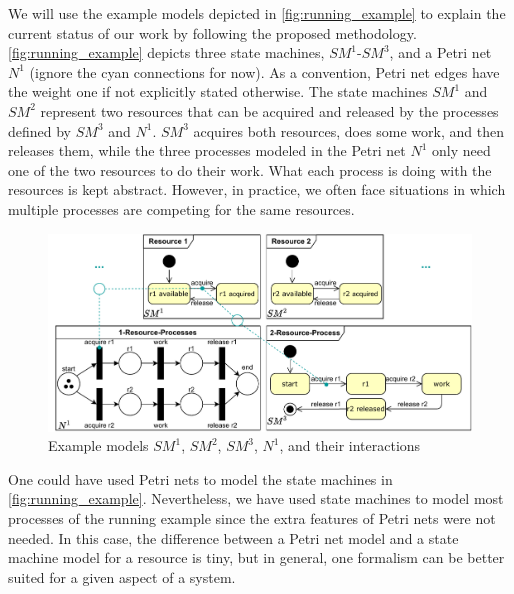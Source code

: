 \documentclass[conference]{IEEEtran}
\begin{document}
We will use the example models depicted in \autoref{fig:running_example} to explain the current status of our work by following the proposed methodology.
\autoref{fig:running_example} depicts three state machines, $SM^1$-$SM^3$, and a Petri net $N^1$ (ignore the cyan connections for now).
As a convention, Petri net edges have the weight one if not explicitly stated otherwise.
The state machines $SM^1$ and $SM^2$ represent two resources that can be acquired and released by the processes defined by $SM^3$ and $N^1$.
$SM^3$ acquires both resources, does some work, and then releases them, while the three processes modeled in the Petri net $N^1$ only need one of the two resources to do their work.
What each process is doing with the resources is kept abstract.
However, in practice, we often face situations in which multiple processes are competing for the same resources.

\begin{figure}[h]
    \centering
    \includegraphics[width=5in]{example}
    \caption{Example models $SM^1$, $SM^2$, $SM^3$, $N^1$, and their interactions}
    \label{fig:running_example}
\end{figure}

One could have used Petri nets to model the state machines in \autoref{fig:running_example}.
Nevertheless, we have used state machines to model most processes of the running example since the extra features of Petri nets were not needed.
In this case, the difference between a Petri net model and a state machine model for a resource is tiny, but in general, one formalism can be better suited for a given aspect of a system.
\end{document}
